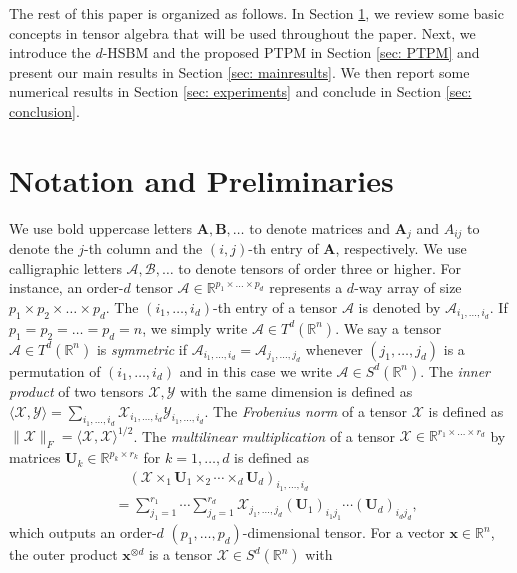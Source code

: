 \documentclass{article}
\theoremstyle{plain}
\theoremstyle{definition}
\theoremstyle{remark}
\newcommand{\Br}{\mathbb{R}}
\newcommand{\BCal}{\mathcal{B}}
\newcommand{\XCal}{\mathcal{X}}
\newcommand{\YCal}{\mathcal{Y}}
\newcommand{\ACal}{\mathcal{A}}
\def\bx{\bm{x}}
\begin{document}
The rest of this paper is organized as follows. In Section \ref{sec: notation-prelim}, we review some basic concepts in tensor algebra that will be used throughout the paper. Next, we introduce the $d$-HSBM and the proposed PTPM in Section \ref{sec: PTPM} and present our main results in Section \ref{sec: mainresults}. We then report some numerical results in Section \ref{sec: experiments} and conclude in Section \ref{sec: conclusion}.

\section{Notation and Preliminaries} \label{sec: notation-prelim}
\label{sec: nota-prelim}
We use bold uppercase letters $\bm{A},\bm{B},\dots$ to denote matrices and $\bm{A}_j$ and $A_{ij}$ to denote the $j$-th column and the $(i,j)$-th entry of $\bm{A}$, respectively. We use calligraphic letters $\ACal,\BCal,\dots$ to denote tensors of order three or higher. For instance, an order-$d$ tensor $\ACal \in \Br^{p_1 \times \dots \times p_d}$ represents a $d$-way array of size $p_1\times p_2 \times \dots \times p_d$. The $(i_1,\dots,i_d)$-th entry of a tensor $\ACal$ is denoted by $\ACal_{i_1,\dots,i_d}$. If $p_1=p_2=\dots=p_d =n$, we simply write $\ACal \in T^d(\Br^n)$. We say a tensor $\ACal \in T^d(\Br^n)$ is \emph{symmetric} if $\ACal_{i_1,\dots,i_d} = \ACal_{j_1,\dots,j_d}$ whenever $(j_1,\dots,j_d)$ is a permutation of $(i_1,\dots,i_d)$ and in this case we write $\ACal \in S^d(\Br^n)$. The \emph{inner product} of two tensors $\XCal,\YCal$ with the same dimension is defined as $\langle \XCal,\YCal \rangle = \sum_{i_1,\dots,i_d} \XCal_{i_1,\dots,i_d} \YCal_{i_1,\dots,i_d}$. The \emph{Frobenius norm} of a tensor $\XCal$ is defined as $\| \XCal \|_F = \langle \XCal,\XCal \rangle^{1/2}$. The \emph{multilinear multiplication} of a tensor $\XCal \in \Br^{r_1\times \dots \times r_d}$ by matrices $\bm{U}_k \in \Br^{p_k \times r_k}$ for $k=1,\dots,d$ is defined as
\begin{align*}
	& \quad \left(\XCal \times_{1} \mathbf{U}_{1} \times_2 \cdots  \times_{d} \mathbf{U}_{d}\right)_{i_{1}, \ldots, i_{d}}\\
	& =\sum_{j_{1}=1}^{r_{1}} \cdots \sum_{j_{d}=1}^{r_{d}} \mathcal{X}_{j_{1}, \ldots, j_{d}}\left(\mathbf{U}_{1}\right)_{i_{1} j_{1}} \cdots\left(\mathbf{U}_{d}\right)_{i_{d} j_{d}},
\end{align*}
which outputs an order-$d$ $(p_1,\dots,p_d)$-dimensional tensor. For a vector $\bx \in \Br^n$, the outer product $\bx^{\otimes d}$ is a tensor $\XCal \in S^d(\Br^n)$ with
\end{document}

